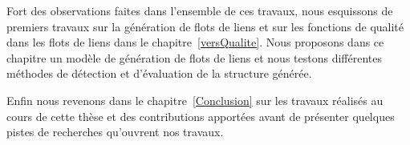Fort des observations faites dans l'ensemble de ces travaux, nous esquissons de premiers travaux sur la génération de flots de liens et sur les fonctions de qualité dans les flots de liens dans le chapitre~\ref{versQualite}.
Nous proposons dans ce chapitre un modèle de génération de flots de liens et nous testons différentes méthodes de détection et d'évaluation de la structure générée.


Enfin nous revenons dans le chapitre~\ref{Conclusion} sur les travaux réalisés au cours de cette thèse et des contributions apportées avant de présenter quelques pistes de recherches qu'ouvrent nos travaux.